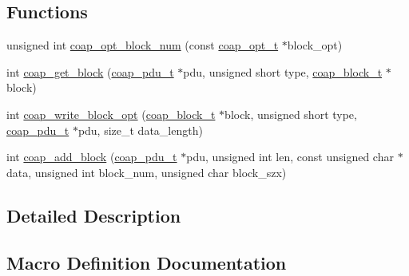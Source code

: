 \subsection*{Functions}
\begin{DoxyCompactItemize}
\item 
unsigned int \hyperlink{group__block_gaac6c90297abc6e2da80a6212b0d10e99}{coap\+\_\+opt\+\_\+block\+\_\+num} (const \hyperlink{option_8h_a351867e79474c96130f738fcfbc120cc}{coap\+\_\+opt\+\_\+t} $\ast$block\+\_\+opt)
\item 
int \hyperlink{group__block_ga265adcc610026896a5e8a046bcc359ca}{coap\+\_\+get\+\_\+block} (\hyperlink{structcoap__pdu__t}{coap\+\_\+pdu\+\_\+t} $\ast$pdu, unsigned short type, \hyperlink{structcoap__block__t}{coap\+\_\+block\+\_\+t} $\ast$block)
\item 
int \hyperlink{group__block_ga0750df07c7545ffade46ba6669aa5b54}{coap\+\_\+write\+\_\+block\+\_\+opt} (\hyperlink{structcoap__block__t}{coap\+\_\+block\+\_\+t} $\ast$block, unsigned short type, \hyperlink{structcoap__pdu__t}{coap\+\_\+pdu\+\_\+t} $\ast$pdu, size\+\_\+t data\+\_\+length)
\item 
int \hyperlink{group__block_ga44c746196920a4ea3cd6e2f5df78c046}{coap\+\_\+add\+\_\+block} (\hyperlink{structcoap__pdu__t}{coap\+\_\+pdu\+\_\+t} $\ast$pdu, unsigned int len, const unsigned char $\ast$data, unsigned int block\+\_\+num, unsigned char block\+\_\+szx)
\end{DoxyCompactItemize}


\subsection{Detailed Description}


\subsection{Macro Definition Documentation}
\hypertarget{group__block_ga1a064effcefd02b9e5c8f99b297c0edc}{}
